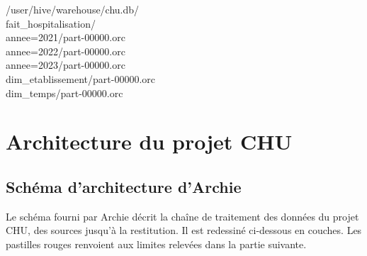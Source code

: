 \begin{center}
\begin{minipage}{0.62\textwidth}
\begin{tcolorbox}[colback=title2!6,colframe=title1,title=\textbf{Stockage physique dans HDFS},fonttitle=\small,boxsep=2pt]
\ttfamily\scriptsize
/user/hive/warehouse/chu.db/\\
\hspace*{1em}fait\_hospitalisation/\\
\hspace*{2em}annee=2021/\hspace*{1em}part-00000.orc\\
\hspace*{2em}annee=2022/\hspace*{1em}part-00000.orc\\
\hspace*{2em}annee=2023/\hspace*{1em}part-00000.orc\\
\hspace*{1em}dim\_etablissement/\hspace*{1em}part-00000.orc\\
\hspace*{1em}dim\_temps/\hspace*{1em}part-00000.orc
\end{tcolorbox}
\end{minipage}
\end{center}


\newpage
\section{Architecture du projet CHU}

\subsection{Schéma d'architecture d'Archie}

\noindent Le schéma fourni par Archie décrit la chaîne de traitement des données du projet CHU, des sources jusqu'à la restitution. Il est redessiné ci-dessous en couches. Les pastilles rouges renvoient aux limites relevées dans la partie suivante.


